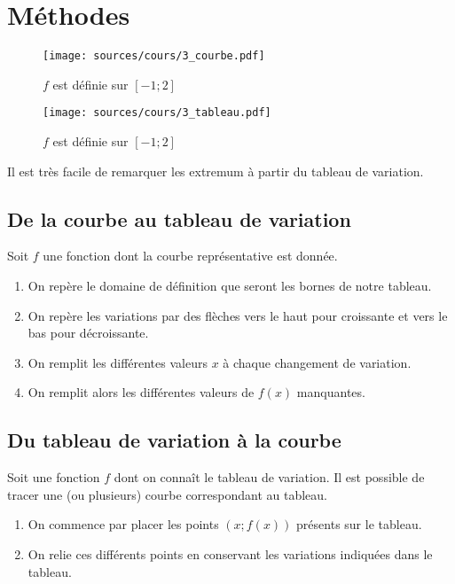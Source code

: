 \documentclass[paper=a4, fontsize=9pt]{scrartcl} %
\begin{document}
\newpage
\section{Méthodes}

\begin{multicols}{2}

  \begin{figure}[H]
    \centering
    \texttt{[image: sources/cours/3\_courbe.pdf]}
    \caption{$f$ est définie sur $[-1; 2]$}
  \end{figure}

  \begin{figure}[H]
    \centering
    \texttt{[image: sources/cours/3\_tableau.pdf]}
    \caption{$f$ est définie sur $[-1; 2]$}
  \end{figure}

  Il est très facile de remarquer les extremum à partir du tableau de variation.

\end{multicols}

\subsection{De la courbe au tableau de variation}

Soit $f$ une fonction dont la courbe représentative est donnée.

\begin{enumerate}
\item On repère le domaine de définition que seront les bornes de notre tableau.
\item On repère les variations par des flèches vers le haut pour croissante et vers le bas pour décroissante.
\item On remplit les différentes valeurs $x$ à chaque changement de variation.
\item On remplit alors les différentes valeurs de $f(x)$ manquantes.
\end{enumerate}

\subsection{Du tableau de variation à la courbe}

Soit une fonction $f$ dont on connaît le tableau de variation. Il est possible de tracer une (ou plusieurs) courbe correspondant au tableau.

\begin{enumerate}
\item On commence par placer les points $(x ; f(x) )$ présents sur le tableau.
\item On relie ces différents points en conservant les variations indiquées dans le tableau.
\end{enumerate}
\end{document}
